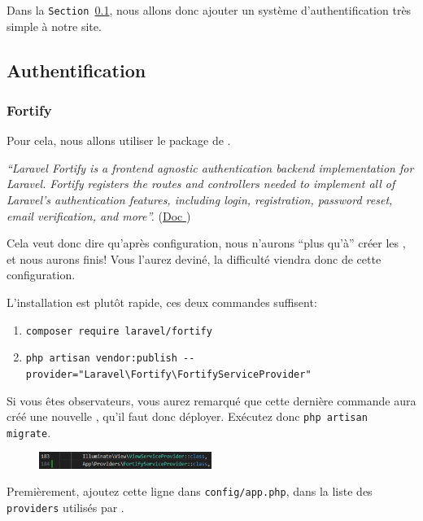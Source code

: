 \documentclass[internal]{nhitec_design}
\begin{document}
Dans la \texttt{Section~\ref{sec:auth}}, nous allons donc ajouter un système d'authentification très simple à notre site.

\subsection[]{Authentification}\label{sec:auth}

\subsubsection[Fortify][laravel.com/docs/10.x/fortify]{Fortify}

Pour cela, nous allons utiliser le package \fortify{} de \laravel{}. 

\textit{``Laravel Fortify is a frontend agnostic authentication backend implementation for Laravel. Fortify registers the routes and controllers needed to implement all of Laravel's authentication features, including login, registration, password reset, email verification, and more''.} (\href{https://laravel.com/docs/10.x/fortify#what-is-fortify}{Doc \laravel})

Cela veut donc dire qu'après configuration, nous n'aurons ``plus qu'à'' créer les \views, et nous aurons finis! Vous l'aurez deviné, la difficulté viendra donc de cette configuration.

L'installation est plutôt rapide, ces deux commandes suffisent:
\begin{enumerate}
    \item \verb|composer require laravel/fortify|
    \item \verb|php artisan vendor:publish --provider="Laravel\Fortify\FortifyServiceProvider"|
\end{enumerate}

Si vous êtes observateurs, vous aurez remarqué que cette dernière commande aura créé une nouvelle \migration{}, qu'il faut donc déployer. Exécutez donc \verb|php artisan migrate|.



\begin{figure}
    \vspace{-0.5cm}
    \includegraphics[width=0.5\textwidth]{figures-C1/config_app.pdf}
\end{figure}
Premièrement, ajoutez cette ligne dans \linebreak \verb|config/app.php|, dans la liste des \verb|providers| utilisés par \laravel{}.
\end{document}
